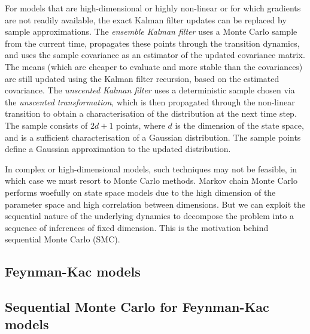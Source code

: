 For models that are high-dimensional or highly non-linear or for which gradients are not readily available, the exact Kalman filter updates can be replaced by sample approximations.
The \emph{ensemble Kalman filter} \parencite{evensen1994} uses a Monte Carlo sample from the current time, propagates these points through the transition dynamics, and uses the sample covariance as an estimator of the updated covariance matrix. The means (which are cheaper to evaluate and more stable than the covariances) are still updated using the Kalman filter recursion, based on the estimated covariance.
The \emph{unscented Kalman filter} \parencite{wan2000} uses a deterministic sample chosen via the \emph{unscented transformation}, which is then propagated through the non-linear transition to obtain a characterisation of the distribution at the next time step. The sample consists of $2d+1$ points, where $d$ is the dimension of the state space, and is a sufficient characterisation of a Gaussian distribution. The sample points define a Gaussian approximation to the updated distribution.

In complex or high-dimensional models, such techniques may not be feasible, in which case we must resort to Monte Carlo methods.
Markov chain Monte Carlo performs woefully on state space models due to the high dimension of the parameter space and high correlation between dimensions. 
But we can exploit the sequential nature of the underlying dynamics to decompose the problem into a sequence of inferences of fixed dimension.
This is the motivation behind sequential Monte Carlo (SMC).


\subsection{Feynman-Kac models}

\subsection{Sequential Monte Carlo for Feynman-Kac models}

